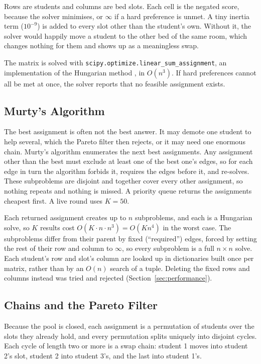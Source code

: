Rows are students and columns are bed slots. Each cell is the negated
score, because the solver minimises, or $\infty$ if a hard preference is
unmet. A tiny inertia term ($10^{-9}$) is added to every slot other than
the student's own. Without it, the solver would happily move a student
to the other bed of the same room, which changes nothing for them and
shows up as a meaningless swap.

The matrix is solved with
\texttt{scipy.optimize.linear\_sum\_assignment}, an implementation of
the Hungarian method \cite{kuhn1955hungarian,munkres1957}, in $O(n^3)$.
If hard preferences cannot all be met at once, the solver reports that
no feasible assignment exists.

\subsection{Murty's Algorithm}

The best assignment is often not the best answer. It may demote one
student to help several, which the Pareto filter then rejects, or it may
need one enormous chain. Murty's algorithm \cite{murty1968ranking}
enumerates the next best assignments. Any assignment other than the best
must exclude at least one of the best one's edges, so for each edge in
turn the algorithm forbids it, requires the edges before it, and
re-solves. These subproblems are disjoint and together cover every
other assignment, so nothing repeats and nothing is missed. A priority
queue returns the assignments cheapest first. A live round uses
$K = 50$.

Each returned assignment creates up to $n$ subproblems, and each is a
Hungarian solve, so $K$ results cost $O(K \cdot n \cdot n^3) = O(Kn^4)$
in the worst case. The subproblems differ from their parent by fixed
(``required'') edges, forced by setting the rest of their row and
column to $\infty$, so every subproblem is a full $n \times n$ solve.
Each student's row and slot's column are looked up in dictionaries
built once per matrix, rather than by an $O(n)$ search of a tuple.
Deleting the fixed rows and columns instead was tried and rejected
(Section~\ref{sec:performance}).

\subsection{Chains and the Pareto Filter}

Because the pool is closed, each assignment is a permutation of students
over the slots they already hold, and every permutation splits uniquely
into disjoint cycles. Each cycle of length two or more is a swap chain:
student 1 moves into student 2's slot, student 2 into student 3's, and
the last into student 1's.

